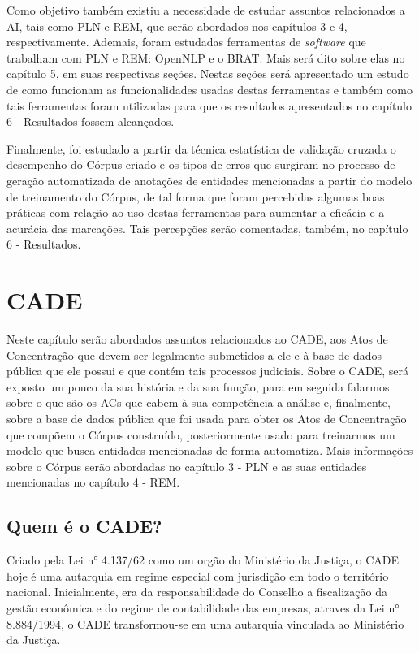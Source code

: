 \documentclass[11pt]{report}
\begin{document}
Como objetivo também existiu a necessidade de estudar assuntos relacionados a AI, tais como PLN e REM, que serão abordados nos capítulos 3 e 4, respectivamente.
Ademais, foram estudadas ferramentas de \textit{software} que trabalham com PLN e REM: OpenNLP e o BRAT. Mais será dito sobre elas no capítulo 5, em suas
respectivas seções. Nestas seções será apresentado um estudo de como funcionam as funcionalidades usadas destas ferramentas e também como tais ferramentas foram
utilizadas para que os resultados apresentados no capítulo 6 - Resultados fossem alcançados.

Finalmente, foi estudado a partir da técnica estatística de validação cruzada o desempenho do Córpus criado e os tipos de erros que surgiram no processo de geração automatizada
de anotações de entidades mencionadas a partir do modelo de treinamento do Córpus, de tal forma que foram percebidas algumas boas práticas com relação ao uso destas ferramentas
para aumentar a eficácia e a acurácia das marcações. Tais percepções serão comentadas, também, no capítulo 6 - Resultados.

\pagebreak
\chapter{CADE}

\indent\indent Neste capítulo serão abordados assuntos relacionados ao CADE, aos Atos de Concentração que devem ser legalmente submetidos a ele e à base de dados pública que ele possui e
que contém tais processos judiciais. Sobre o CADE, será exposto um pouco da sua história e da sua função, para em seguida falarmos sobre o que são os ACs que cabem à sua competência
a análise e, finalmente, sobre a base de dados pública que foi usada para obter os Atos de Concentração que compõem o Córpus construído, posteriormente usado para treinarmos um modelo
que busca entidades mencionadas de forma automatiza. Mais informações sobre o Córpus serão abordadas no capítulo 3 - PLN e as suas entidades mencionadas no capítulo 4 - REM.

\section{Quem é o CADE?}

\indent\indent Criado pela Lei n° 4.137/62 como um orgão do Ministério da Justiça, o CADE hoje é uma autarquia em regime especial com jurisdição em todo o território nacional. Inicialmente,
era da responsabilidade do Conselho a fiscalização da gestão econômica e do regime de contabilidade das empresas, atraves da Lei n° 8.884/1994, o CADE transformou-se em uma
autarquia vinculada ao Ministério da Justiça.
\end{document}
